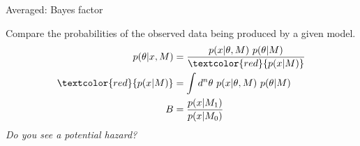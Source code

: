 \documentclass[
aspectratio=169,
14pt,
professionalfonts
]{beamer}
\begin{document}
\begin{frame}{Averaged: Bayes factor}
    \vspace{-0.5cm}
        \begin{minipage}{0.74\textwidth}
            Compare the probabilities of the observed data being produced by a given model.
            \begin{align*}
                p(\theta | x, M) &= \frac{p(x | \theta, M) ~ p(\theta | M)}{\textcolor{red}{p(x | M)}}\\
                \textcolor{red}{p(x | M)} &= \int d^n \theta ~ p(x | \theta, M) ~ p(\theta | M)\\
                B &= \frac{p(x | M_1)}{p(x| M_0)}
            \end{align*}
            \textit{Do you see a potential hazard?}
        \end{minipage}
        \begin{minipage}{0.25\textwidth}
            \begin{figure}
                \centering

\end{figure}
\end{minipage}
\end{frame}
\end{document}
